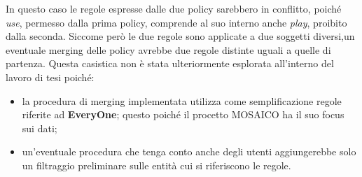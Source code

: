 \documentclass[12pt,a4paper,twoside]{book}
\begin{document}
In questo caso le regole espresse dalle due policy sarebbero in conflitto, poiché \textit{use}, permesso dalla prima policy, comprende al suo interno anche \textit{play}, proibito dalla seconda. Siccome però le due regole sono applicate a due soggetti diversi,un eventuale merging delle policy avrebbe due regole distinte uguali a quelle di partenza. Questa casistica non è stata ulteriormente esplorata all'interno del lavoro di tesi poiché:
\begin{itemize}
\item la procedura di merging implementata utilizza come semplificazione regole riferite ad \textbf{EveryOne}; questo poiché il procetto MOSAICO ha il suo focus sui dati;
\item un'eventuale procedura che tenga conto anche degli utenti aggiungerebbe solo un filtraggio preliminare sulle entità cui si riferiscono le regole.
\end{itemize}
\label{noStrat}
\end{document}
